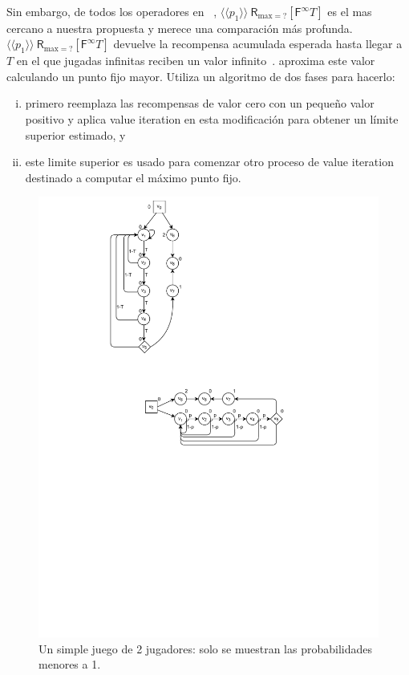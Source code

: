 Sin embargo, de todos los operadores en ~\cite{DBLP:journals/fmsd/ChenFKPS13,SvorenovaKwiatkowska16,DBLP:conf/cav/KwiatkowskaN0S20}, $\langle \langle p_1 \rangle \rangle \ \textsf{R}_{\text{max}{=}?}[\textsf{F}^{\infty} T]$ es el mas cercano a nuestra propuesta y merece una comparación más profunda. $\langle \langle p_1 \rangle \rangle \ \textsf{R}_{\text{max}{=}?}[\textsf{F}^{\infty} T]$ devuelve la recompensa acumulada esperada hasta llegar a $ T$ en el que jugadas infinitas reciben un valor infinito~\cite{DBLP:journals/fmsd/ChenFKPS13,DBLP:conf/cav/KwiatkowskaN0S20}.
{\Prism} aproxima este valor calculando un punto fijo mayor. Utiliza un algoritmo de dos fases para hacerlo:
\begin{enumerate}[(i)]
\item%
  primero reemplaza las recompensas de valor cero con un pequeño valor positivo y aplica value iteration en esta modificación para obtener un límite superior estimado, y
\item%
  este limite superior es usado para comenzar otro proceso de value iteration destinado a computar el máximo punto fijo.
\end{enumerate}
%
\begin{figure}
\centering
\includegraphics[scale=0.80]{Figs/prism-cex-1-horiz.pdf}%
\caption{Un simple juego de 2 jugadores: solo se muestran las probabilidades menores a 1.} \label{fig:prism-cex-1}
\end{figure}
